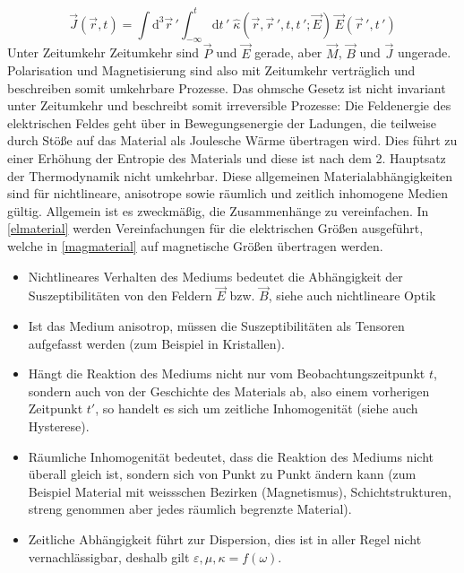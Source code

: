  \begin{equation}\label{matohm}\vec{J}(\vec{r},t)=\int \mathrm d^3\vec{r}\,'\int_{-\infty}^t\mathrm dt\,'\;\hat{\kappa}(\vec{r},\vec{r}\,',t,t\,';\vec{E})\,\vec{E}(\vec{r}\,',t\,')\end{equation}
 Unter Zeitumkehr Zeitumkehr sind $\vec{P}$ und $\vec{E}$ gerade, aber $\vec{M}$, $\vec{B}$ und $\vec{J}$ ungerade. Polarisation und Magnetisierung sind also mit Zeitumkehr verträglich und beschreiben somit umkehrbare Prozesse. Das ohmsche Gesetz ist nicht invariant unter Zeitumkehr und beschreibt somit irreversible Prozesse: Die Feldenergie des elektrischen Feldes geht über in Bewegungsenergie der Ladungen, die teilweise durch Stöße auf das Material als Joulesche Wärme übertragen wird. Dies führt zu einer Erhöhung der Entropie des Materials und diese ist nach dem 2. Hauptsatz der Thermodynamik nicht umkehrbar. Diese allgemeinen Materialabhängigkeiten sind für nichtlineare, anisotrope sowie räumlich und zeitlich inhomogene Medien gültig. Allgemein ist es zweckmäßig, die Zusammenhänge zu vereinfachen. In \ref{elmaterial} werden Vereinfachungen für die elektrischen Größen ausgeführt, welche in \ref{magmaterial} auf magnetische Größen übertragen werden.  
 \begin{itemize}
 	 \item Nichtlineares Verhalten des Mediums bedeutet die Abhängigkeit der Suszeptibilitäten von den Feldern $\vec E$ bzw. $\vec B$, siehe auch nichtlineare Optik
 	\item Ist das Medium anisotrop, müssen die Suszeptibilitäten als Tensoren aufgefasst werden (zum Beispiel in Kristallen).
 	\item Hängt die Reaktion des Mediums nicht nur vom Beobachtungszeitpunkt $t$, sondern auch von der Geschichte des Materials ab, also einem vorherigen Zeitpunkt $t'$, so handelt es sich um zeitliche Inhomogenität (siehe auch Hysterese).
 	 \item  Räumliche Inhomogenität bedeutet, dass die Reaktion des Mediums nicht überall gleich ist, sondern sich von Punkt zu Punkt ändern kann (zum Beispiel Material mit weissschen Bezirken (Magnetismus), Schichtstrukturen, streng genommen aber jedes räumlich begrenzte Material).
 	\item  Zeitliche Abhängigkeit führt zur Dispersion, dies ist in aller Regel nicht vernachlässigbar, deshalb gilt $\varepsilon,\mu,\kappa=f(\omega)$.
 \end{itemize}
